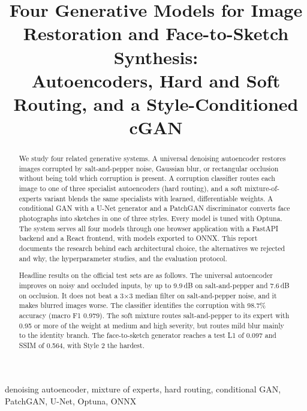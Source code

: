 \documentclass[conference]{IEEEtran}
\begin{document}
\title{Four Generative Models for Image Restoration and Face-to-Sketch Synthesis:\\
Autoencoders, Hard and Soft Routing, and a Style-Conditioned cGAN}

\author{
}

\maketitle

\begin{abstract}
We study four related generative systems. A universal denoising autoencoder restores
images corrupted by salt-and-pepper noise, Gaussian blur, or rectangular occlusion without
being told which corruption is present. A corruption classifier routes each image to one of
three specialist autoencoders (hard routing), and a soft mixture-of-experts variant blends the
same specialists with learned, differentiable weights. A conditional GAN with a U-Net generator
and a PatchGAN discriminator converts face photographs into sketches in one of three styles.
Every model is tuned with Optuna. The system serves all four models through one
browser application with a FastAPI backend and a React frontend, with models exported to ONNX. This report
documents the research behind each architectural choice, the alternatives we rejected and why,
the hyperparameter studies, and the evaluation protocol.

Headline results on the official test sets are as follows. The universal autoencoder improves on noisy and
occluded inputs, by up to 9.9\,dB on salt-and-pepper and 7.6\,dB on occlusion. It does not beat a 3$\times$3
median filter on salt-and-pepper noise, and it makes blurred images worse. The classifier identifies the
corruption with 98.7\% accuracy (macro F1 0.979). The soft mixture routes salt-and-pepper to its expert with
0.95 or more of the weight at medium and high severity, but routes mild blur mainly to the identity branch.
The face-to-sketch generator reaches a test L1 of 0.097 and SSIM of 0.564, with Style 2 the hardest.
\end{abstract}

\begin{IEEEkeywords}
denoising autoencoder, mixture of experts, hard routing, conditional GAN, PatchGAN, U-Net,
Optuna, ONNX
\end{IEEEkeywords}
\end{document}
